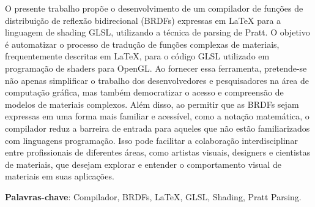 \setlength{\absparsep}{18pt} %
\begin{resumo}
 


O presente trabalho propõe o desenvolvimento de um compilador de funções de distribuição de reflexão bidirecional (BRDFs) expressas em LaTeX para a linguagem de shading GLSL, utilizando a técnica de parsing de Pratt. O objetivo é automatizar o processo de tradução de funções complexas de materiais, frequentemente descritas em LaTeX, para o código GLSL utilizado em programação de shaders para OpenGL. Ao fornecer essa ferramenta, pretende-se não apenas simplificar o trabalho dos desenvolvedores e pesquisadores na área de computação gráfica, mas também democratizar o acesso e compreensão de modelos de materiais complexos. Além disso, ao permitir que as BRDFs sejam expressas em uma forma mais familiar e acessível, como a notação matemática, o compilador reduz a barreira de entrada para aqueles que não estão familiarizados com linguagens programação. Isso pode facilitar a colaboração interdisciplinar entre profissionais de diferentes áreas, como artistas visuais, designers e cientistas de materiais, que desejam explorar e entender o comportamento visual de materiais em suas aplicações.

 \textbf{Palavras-chave}: Compilador, BRDFs, LaTeX, GLSL, Shading, Pratt Parsing.
\end{resumo}
